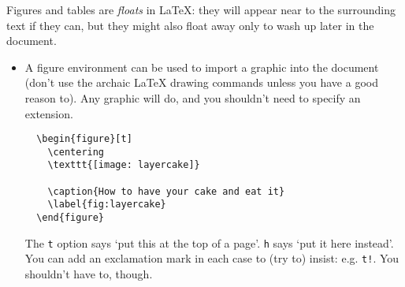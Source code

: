 \documentclass[dissertation]{softeng}
\begin{document}
Figures and tables are \emph{floats} in \LaTeX: they will appear near
to the surrounding text if they can, but they might also float away
only to wash up later in the document.  
\begin{itemize}\raggedright
\item A figure environment can be used to import a graphic into the
  document (don't use the archaic {\LaTeX} drawing commands unless you
  have a good reason to).  Any graphic will do, and you shouldn't
  need to specify an extension.  
\begin{verbatim}
  \begin{figure}[t]
    \centering
    \texttt{[image: layercake]}

    \caption{How to have your cake and eat it}
    \label{fig:layercake}
  \end{figure}
\end{verbatim}
  The \verb|t| option says `put this at the top of a page'.  \verb|h|
  says `put it here instead'.  You can add an exclamation mark in each
  case to (try to) insist: e.g. \verb|t!|.  You shouldn't have to,
  though. 


\end{itemize}
\end{document}
